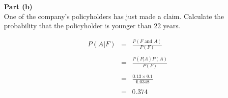 \documentclass[a4paper,12pt]{article}
\begin{document}
	
	\noindent \textbf{Part (b) } \\
	\noindent
	One of the company’s policyholders has just made a claim. Calculate the probability that the policyholder is younger than 22 years.
	
	\begin{eqnarray*}
		P ( A | F ) 
		&=& \frac{P(F \mbox{ and } A)}{P(F)}\\
		& & \\
		&=& \frac{P (F | A) P (A) }{P(F)}\\
		& & \\
		&=& \frac{0.13 \times 0.1 }{0.0348}\\
		& & \\
		&=& 0.374\\
	\end{eqnarray*}
	
	
	
\end{document}

